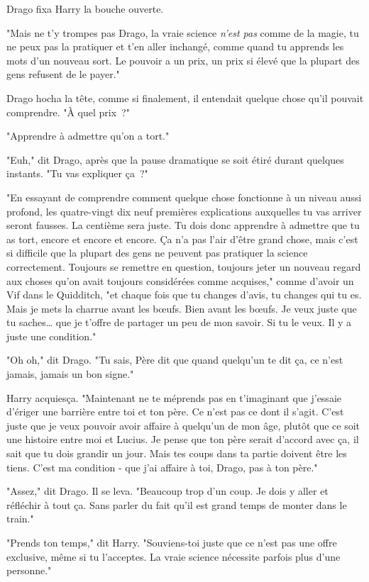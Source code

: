 Drago fixa Harry la bouche ouverte.

"Mais ne t'y trompes pas Drago, la vraie science \emph{n'est pas} comme de la magie, tu ne peux pas la pratiquer et t'en aller inchangé, comme quand tu apprends les mots d'un nouveau sort. Le pouvoir a un prix, un prix si élevé que la plupart des gens refusent de le payer."

Drago hocha la tête, comme si finalement, il entendait quelque chose qu'il pouvait comprendre. "À quel prix~?"

"Apprendre à admettre qu'on a tort."

"Euh," dit Drago, après que la pause dramatique se soit étiré durant quelques instants. "Tu vas expliquer ça~?"

"En essayant de comprendre comment quelque chose fonctionne à un niveau aussi profond, les quatre-vingt dix neuf premières explications auxquelles tu vas arriver seront fausses. La centième sera juste. Tu dois donc apprendre à admettre que tu as tort, encore et encore et encore. Ça n'a pas l'air d'être grand chose, mais c'est si difficile que la plupart des gens ne peuvent pas pratiquer la science correctement. Toujours se remettre en question, toujours jeter un nouveau regard aux choses qu'on avait toujours considérées comme acquises," comme d'avoir un Vif dans le Quidditch, "et chaque fois que tu changes d'avis, tu changes qui tu es. Mais je mets la charrue avant les bœufs. Bien avant les bœufs. Je veux juste que tu saches… que je t'offre de partager un peu de mon savoir. Si tu le veux. Il y a juste une condition."

"Oh oh," dit Drago. "Tu sais, Père dit que quand quelqu'un te dit ça, ce n'est jamais, jamais un bon signe."

Harry acquiesça. "Maintenant ne te méprends pas en t'imaginant que j'essaie d'ériger une barrière entre toi et ton père. Ce n'est pas ce dont il s'agit. C'est juste que je veux pouvoir avoir affaire à quelqu'un de mon âge, plutôt que ce soit une histoire entre moi et Lucius. Je pense que ton père serait d'accord avec ça, il sait que tu dois grandir un jour. Mais tes coups dans ta partie doivent être les tiens. C'est ma condition - que j'ai affaire à toi, Drago, pas à ton père."

"Assez," dit Drago. Il se leva. "Beaucoup trop d'un coup. Je dois y aller et réfléchir à tout ça. Sans parler du fait qu'il est grand temps de monter dans le train."

"Prends ton temps," dit Harry. "Souviens-toi juste que ce n'est pas une offre exclusive, même si tu l'acceptes. La vraie science nécessite parfois plus d'une personne."

